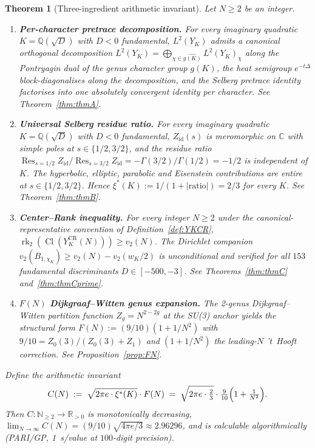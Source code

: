 \documentclass[11pt,a4paper,reqno]{amsart}
\newtheorem{theorem}{Theorem}[section]
\theoremstyle{definition}
\DeclareMathOperator{\Cl}{Cl}
\DeclareMathOperator{\rk}{rk}
\DeclareMathOperator{\Res}{Res}
\newcommand{\RR}{\mathbb{R}}
\newcommand{\CC}{\mathbb{C}}
\newcommand{\QQ}{\mathbb{Q}}
\newcommand{\NN}{\mathbb{N}}
\newcommand{\YK}{Y_K}
\newcommand{\gK}{g(K)}
\newcommand{\dualgK}{\widehat{g(K)}}
\newcommand{\xis}{\xi^{*}}
\newcommand{\vtwo}{v_2}
\newcommand{\YKCR}{Y_K^{\mathrm{CR}}}
\newcommand{\Cinv}{C}
\begin{document}
\begin{theorem}[Three-ingredient arithmetic invariant]\label{thm:main}
Let $N\ge 2$ be an integer.
\begin{enumerate}[label=\textup{(\Alph*)},leftmargin=2em]
  \item \textbf{Per-character pretrace decomposition.} For every imaginary
        quadratic $K=\QQ(\sqrt{D})$ with $D<0$ fundamental, $L^{2}(\YK)$
        admits a canonical orthogonal decomposition
        $L^{2}(\YK)=\bigoplus_{\chi\in\dualgK}L^{2}(\YK)_{\chi}$ along the
        Pontryagin dual of the genus character group $\gK$, the heat
        semigroup $e^{-t\Delta}$ block-diagonalises along the decomposition,
        and the Selberg pretrace identity factorises into one absolutely
        convergent identity per character.  See Theorem~\ref{thm:thmA}.
  \item \textbf{Universal Selberg residue ratio.} For every imaginary
        quadratic $K=\QQ(\sqrt{D})$ with $D<0$ fundamental,
        $Z_{\mathrm{id}}(s)$ is meromorphic on $\CC$ with simple poles at
        $s\in\{1/2,3/2\}$, and the residue ratio
        $\Res_{s=1/2}Z_{\mathrm{id}}/\Res_{s=3/2}Z_{\mathrm{id}}
         = -\Gamma(3/2)/\Gamma(1/2) = -1/2$
        is independent of $K$.  The hyperbolic, elliptic, parabolic and
        Eisenstein contributions are entire at $s\in\{1/2,3/2\}$.  Hence
        $\xis(K) := 1/(1+|\mathrm{ratio}|) = 2/3$ for every $K$.  See
        Theorem~\ref{thm:thmB}.
  \item \textbf{Center--Rank inequality.} For every integer $N\ge 2$ under
        the canonical-representative convention of Definition~\ref{def:YKCR},
        $\rk_{2}(\Cl(\YKCR(N)))\ge\vtwo(N)$.  The Dirichlet companion
        $\vtwo(B_{1,\chi_{K}})\ge\vtwo(N)-\vtwo(w_{K}/2)$ is unconditional and
        verified for all $153$ fundamental discriminants $D\in[-500,-3]$.
        See Theorems~\ref{thm:thmC} and~\ref{thm:thmCprime}.
  \item \textbf{$F(N)$ Dijkgraaf--Witten genus expansion.} The 2-genus
        Dijkgraaf--Witten partition function $Z_{g}=N^{2-2g}$ at the SU(3)
        anchor yields the structural form
        $F(N) := (9/10)(1+1/N^{2})$ with $9/10 = Z_{0}(3)/(Z_{0}(3)+Z_{1})$
        and $(1+1/N^{2})$ the leading-$N$ 't~Hooft correction.  See
        Proposition~\ref{prop:FN}.
\end{enumerate}
Define the arithmetic invariant
\begin{equation}\label{eq:CN}
   \Cinv(N) \;:=\; \sqrt{2\pi e \cdot \xis(K)} \cdot F(N)
            \;=\; \sqrt{2\pi e \cdot \tfrac{2}{3}} \cdot \tfrac{9}{10}
                  \Bigl(1+\tfrac{1}{N^{2}}\Bigr).
\end{equation}
Then $\Cinv:\NN_{\ge 2}\to\RR_{>0}$ is monotonically decreasing,
$\lim_{N\to\infty}\Cinv(N) = (9/10)\sqrt{4\pi e/3} \approx 2.96296$, and is
calculable algorithmically (PARI/GP, 1~s/value at $100$-digit precision).
\end{theorem}
\end{document}

